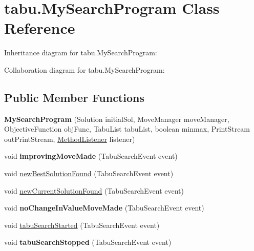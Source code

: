 \hypertarget{classtabu_1_1_my_search_program}{}\section{tabu.\+My\+Search\+Program Class Reference}
\label{classtabu_1_1_my_search_program}


Inheritance diagram for tabu.\+My\+Search\+Program\+:


Collaboration diagram for tabu.\+My\+Search\+Program\+:
\subsection*{Public Member Functions}
\begin{DoxyCompactItemize}
\item 
{\bfseries My\+Search\+Program} (Solution initial\+Sol, Move\+Manager move\+Manager, Objective\+Function obj\+Func, Tabu\+List tabu\+List, boolean minmax, Print\+Stream out\+Print\+Stream, \hyperlink{interfacesvrptw_1_1_method_listener}{Method\+Listener} listener)\hypertarget{classtabu_1_1_my_search_program_a287138a48f0075fd9875b5e4708f25b5}{}\label{classtabu_1_1_my_search_program_a287138a48f0075fd9875b5e4708f25b5}

\item 
void {\bfseries improving\+Move\+Made} (Tabu\+Search\+Event event)\hypertarget{classtabu_1_1_my_search_program_ab65cba7779d0d1f03aab886289bfc197}{}\label{classtabu_1_1_my_search_program_ab65cba7779d0d1f03aab886289bfc197}

\item 
void \hyperlink{classtabu_1_1_my_search_program_abe442593f8244473422d46ebb1d60ced}{new\+Best\+Solution\+Found} (Tabu\+Search\+Event event)
\item 
void \hyperlink{classtabu_1_1_my_search_program_a5773c8c5fb1ca9c97b09dc47546ccc3f}{new\+Current\+Solution\+Found} (Tabu\+Search\+Event event)
\item 
void {\bfseries no\+Change\+In\+Value\+Move\+Made} (Tabu\+Search\+Event event)\hypertarget{classtabu_1_1_my_search_program_a9d3e352b3e4e11ffa6172f2ce6743571}{}\label{classtabu_1_1_my_search_program_a9d3e352b3e4e11ffa6172f2ce6743571}

\item 
void \hyperlink{classtabu_1_1_my_search_program_a6050e0fe07c172240fcbe08ba919bbee}{tabu\+Search\+Started} (Tabu\+Search\+Event event)
\item 
void {\bfseries tabu\+Search\+Stopped} (Tabu\+Search\+Event event)\hypertarget{classtabu_1_1_my_search_program_a90a708fc04a38e86e9e20031ce9fbed3}{}\label{classtabu_1_1_my_search_program_a90a708fc04a38e86e9e20031ce9fbed3}


\end{DoxyCompactItemize}
